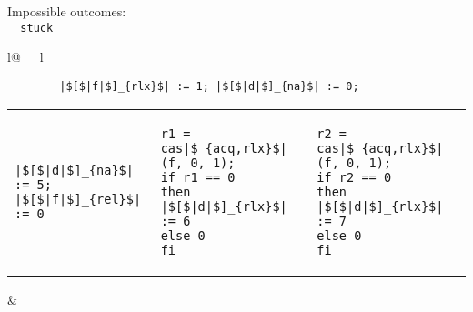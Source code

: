 \begin{minipage}[t]{0.2\linewidth}
Impossible outcomes:\\
\lstinline{  stuck}\\
\end{minipage}
%
\begin{minipage}[t]{0.4\linewidth}
\vspace{-.2cm}
  \begin{tabular}{l@{\ \ \ }l}
    \begin{minipage}[l]{4.3cm} \small
\begin{lstlisting}
        |$[$|f|$]_{rlx}$| := 1; |$[$|d|$]_{na}$| := 0;
\end{lstlisting}
\vspace{-.2cm}
\begin{tabular}{l||l@{\ \ \ \ }||l}
\begin{lstlisting}
|$[$|d|$]_{na}$| := 5;
|$[$|f|$]_{rel}$| := 0
\end{lstlisting}
\hspace{.6cm}
&
\begin{lstlisting}
r1 = cas|$_{acq,rlx}$|(f, 0, 1);
if r1 == 0
then |$[$|d|$]_{rlx}$| := 6
else 0
fi
\end{lstlisting}
\hspace{.6cm}
&
\begin{lstlisting}
r2 = cas|$_{acq,rlx}$|(f, 0, 1);
if r2 == 0
then |$[$|d|$]_{rlx}$| := 7
else 0
fi
\end{lstlisting}
\end{tabular}
    \end{minipage}
&
  \end{tabular}
\end{minipage}
\litmusTestEnd

